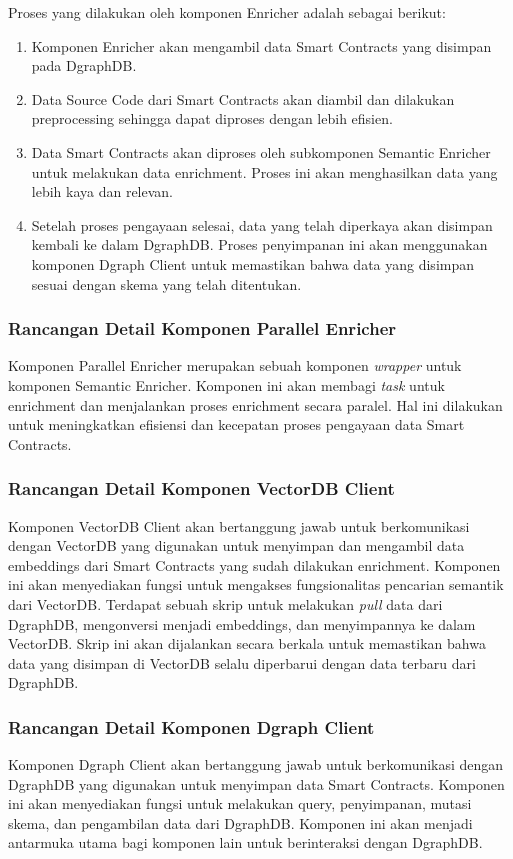Proses yang dilakukan oleh komponen Enricher adalah sebagai berikut:
\begin{enumerate}
	\item Komponen Enricher akan mengambil data Smart Contracts yang disimpan pada DgraphDB.
	\item Data Source Code dari Smart Contracts akan diambil dan dilakukan preprocessing sehingga dapat diproses dengan lebih efisien.
	\item Data Smart Contracts akan diproses oleh subkomponen Semantic Enricher untuk melakukan data enrichment. Proses ini akan menghasilkan data yang lebih kaya dan relevan.
	\item Setelah proses pengayaan selesai, data yang telah diperkaya akan disimpan kembali ke dalam DgraphDB. Proses penyimpanan ini akan menggunakan komponen Dgraph Client untuk memastikan bahwa data yang disimpan sesuai dengan skema yang telah ditentukan.
\end{enumerate}

\subsubsection{Rancangan Detail Komponen Parallel Enricher}

Komponen Parallel Enricher merupakan sebuah komponen \textit{wrapper} untuk komponen Semantic Enricher. Komponen ini akan membagi \textit{task} untuk enrichment dan menjalankan proses enrichment secara paralel. Hal ini dilakukan untuk meningkatkan efisiensi dan kecepatan proses pengayaan data Smart Contracts.

\subsubsection{Rancangan Detail Komponen VectorDB Client}

Komponen VectorDB Client akan bertanggung jawab untuk berkomunikasi dengan VectorDB yang digunakan untuk menyimpan dan mengambil data embeddings dari Smart Contracts yang sudah dilakukan enrichment. Komponen ini akan menyediakan fungsi untuk mengakses fungsionalitas pencarian semantik dari VectorDB. Terdapat sebuah skrip untuk melakukan \textit{pull} data dari DgraphDB, mengonversi menjadi embeddings, dan menyimpannya ke dalam VectorDB. Skrip ini akan dijalankan secara berkala untuk memastikan bahwa data yang disimpan di VectorDB selalu diperbarui dengan data terbaru dari DgraphDB.

\subsubsection{Rancangan Detail Komponen Dgraph Client}

Komponen Dgraph Client akan bertanggung jawab untuk berkomunikasi dengan DgraphDB yang digunakan untuk menyimpan data Smart Contracts. Komponen ini akan menyediakan fungsi untuk melakukan query, penyimpanan, mutasi skema, dan pengambilan data dari DgraphDB. Komponen ini akan menjadi antarmuka utama bagi komponen lain untuk berinteraksi dengan DgraphDB.

